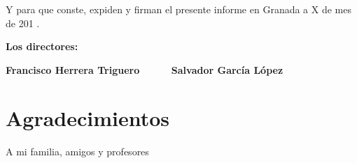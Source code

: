 Y para que conste, expiden y firman el presente informe en Granada a X de mes de 201 .

\vspace{1cm}

\textbf{Los directores:}

\vspace{5cm}

\noindent \textbf{Francisco Herrera Triguero   \ \ \ \ \ Salvador García López }

\chapter*{Agradecimientos}
\thispagestyle{empty}

       \vspace{1cm}


A mi familia, amigos y profesores

